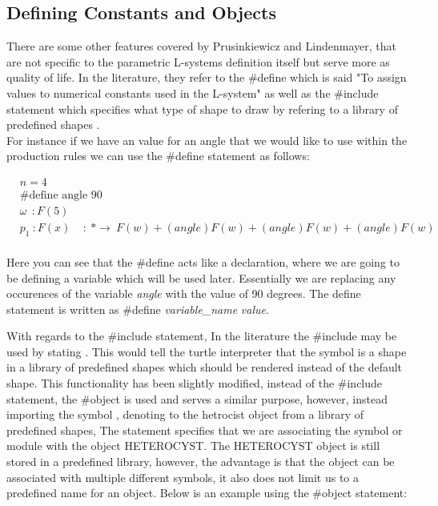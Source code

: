 \subsection{Defining Constants and Objects}

\begin{flushleft}

There are some other features covered by Prusinkiewicz and Lindenmayer, that are not specific to the parametric L-systems definition itself but serve more as quality of life. In the literature, they refer to the \#define which is said "To assign values to numerical constants used in the L-system" as well as the \#include statement which specifies what type of shape to draw by refering to a library of predefined shapes \cite{prusinkiewicz2012algorithmic}. \\
For instance if we have an value for an angle that we would like to use within the production rules we can use the \#define statement as follows:

\vspace{5mm}

\begin{equation} \label{define statement example}
\begin{aligned}
	&n=4 \\
	&\textrm{\#define angle 90}\\
	&\omega~~ : F(5)\\
	&p_1~ :  F(x)~~~~~ :~ * \rightarrow~ F(w)+(angle)F(w)+(angle)F(w)+(angle)F(w)\\
\end{aligned}
\end{equation}

\vspace{5mm}

Here you can see that the \#define acts like a declaration, where we are going to be defining a variable which will be used later. Essentially we are replacing any occurences of the variable \textit{angle} with the value of 90 degrees. The define statement is written as  \#define \textit{variable\_name} \textit{value}. \\

\vspace{5mm}

With regards to the \#include statement, In the literature the \#include may be used by stating . This would tell the turtle interpreter that the symbol  is a shape in a library of predefined shapes which should be rendered instead of the default shape. This functionality has been slightly modified, instead of the \#include statement, the \#object is used and serves a similar purpose, however, instead importing the symbol , denoting to the hetrocist object from a library of predefined shapes, The statement  specifies that we are associating the symbol or module  with the object HETEROCYST. The HETEROCYST object is still stored in a predefined library, however, the advantage is that the object can be associated with multiple different symbols, it also does not limit us to a predefined name for an object. Below is an example using the \#object statement: \\


\end{flushleft}
